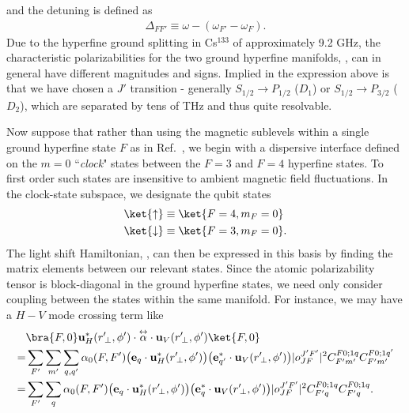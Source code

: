 \documentclass[]{report}
\newcommand{\tensor}[1]{\overset{\leftrightarrow}{#1}} %
\begin{document}
and the detuning is defined as
\begin{align}
	\Delta_{FF'} \equiv \omega - (\omega_{F'} - \omega_{F}).
\end{align}
Due to the hyperfine ground splitting in Cs$^{133}$ of approximately 9.2 GHz, the characteristic 
polarizabilities for the two ground hyperfine manifolds, , can in 
general have different magnitudes and signs.  Implied in the expression above is that we have chosen a 
$J'$ transition - generally $S_{1/2} \rightarrow P_{1/2}$ ($D_1$) or $S_{1/2} \rightarrow P_{3/2}$ ($D_2$), 
which are 
separated by tens of THz and thus quite resolvable.   

Now suppose that rather than using the magnetic sublevels within a single ground hyperfine state $F$ as 
in Ref.~\cite{Deutsch2010a}, we begin with a dispersive interface defined on the $m=0$ ``\textit{clock}" states 
between the $F=3$ and $F=4$ hyperfine states.  To first order such states are insensitive to ambient 
magnetic field fluctuations.  In the clock-state subspace, we designate the qubit states
\begin{align} 
	\ket{\uparrow} &\equiv \ket{F = 4,m_F = 0} \\
 	\ket{\downarrow} &\equiv \ket{F = 3,m_F=0}.
\end{align}
The light shift Hamiltonian, , can then be expressed in this basis by finding 
the 
matrix elements between our relevant states.  Since the atomic polarizability tensor is block-diagonal in 
the ground hyperfine states, we need only consider coupling between the states within the same 
manifold.  
For instance, we may have a $H-V$ mode crossing term like
\begin{align} \label{eq:ClockMatrixElement}
	&\bra{F,0} \mathbf{u}^*_H(r^\prime\!_\perp, \phi') \cdot \tensor{\alpha} \cdot 
	\mathbf{u}_{V}(r^\prime\!_\perp, \phi') \ket{F,0}\nonumber\\
  =& 
	\sum_{F'} \sum_{m'} \sum_{q, q'} \alpha_0(F,F') \big( \mathbf{e}_q \cdot 
	\mathbf{u}^*_H(r^\prime\!_\perp, \phi') \big) 
	\big( \mathbf{e}^*_{q'} \cdot \mathbf{u}_V(r^\prime\!_\perp, \phi') \big) |o^{J'F'}_{JF} |^2 C^{F 0;1 
	q}_{F' m'} C^{F 
	0;1q'}_{F' m'} \\
 = & \sum_{F'} \sum_{q} \alpha_0(F,F') \big( \mathbf{e}_q \cdot \mathbf{u}^*_H(r^\prime\!_\perp, \phi') 
	\big) \big( 
	\mathbf{e}^*_{q} \cdot \mathbf{u}_V(r^\prime\!_\perp, \phi') \big) |o^{J'F'}_{JF} |^2 C^{F 0;1q}_{F' q} 
	C^{F 0;1q}_{F' q}.
\end{align}
\end{document}
